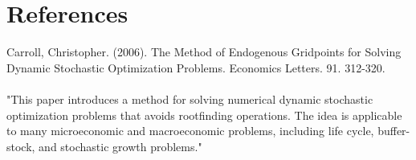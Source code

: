 \documentclass[danish]{article}
\begin{document}
\section{References}

Carroll, Christopher. (2006). The Method of Endogenous Gridpoints for Solving Dynamic Stochastic Optimization Problems. Economics Letters. 91. 312-320.\\
\vspace*{-0.2cm}\\
"This paper introduces a method for solving numerical dynamic stochastic optimization problems that avoids rootfinding operations. The idea is applicable to many microeconomic and macroeconomic problems, including life cycle, buffer-stock, and stochastic growth problems."\\
\vspace*{-0.2cm}\\
\end{document}
